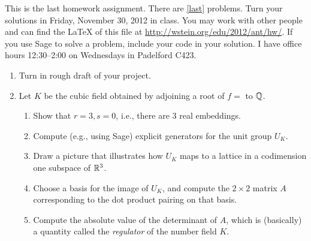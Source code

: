\documentclass{article}
\title{\dred{Math 581e, Fall 2012, Homework 8}}
\author{William Stein ({\tt wstein@uw.edu})}
\date{Due: Friday, November 30, 2012}
\begin{document}
\maketitle

{\color{dbluecolor}  This is the last homework assignment.  There are \ref{last} problems. Turn your solutions
  in Friday, November 30, 2012 in class.  You may work with other
  people and can find the \LaTeX{} of this file at
  \url{http://wstein.org/edu/2012/ant/hw/}.  If you use Sage to solve
  a problem, include your code in your solution. I have office hours
  12:30--2:00 on Wednesdays in Padelford C423.  }


\begin{enumerate}

\item Turn in rough draft of your project.

\item Let $K$ be the cubic field obtained by adjoining a root of $f=$ to $\mathbb{Q}$.
\begin{enumerate}
\item Show that $r=3, s=0$, i.e., there are 3 real embeddings.
\item Compute (e.g., using Sage) explicit generators for the unit group $U_K$.
\item Draw a picture that illustrates how $U_K$ maps to a lattice in a codimension one subspace of $\mathbb{R}^3$.
\item Choose a basis for the image of $U_K$, and compute the $2\times 2$ matrix $A$ corresponding to the
dot product pairing on that basis.
\item Compute the absolute value of the determinant of $A$, which is
  (basically) a quantity called the {\em regulator} of the number
  field $K$.
\end{enumerate}


\end{enumerate}
\end{document}
